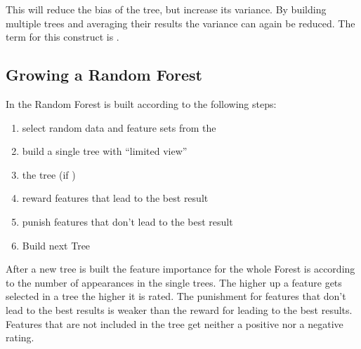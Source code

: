 \documentclass[letterpaper,10pt,english]{sphinxmanual}
\begin{document}
This will reduce the bias of the tree, but increase its variance.
By building multiple trees and averaging their results the variance can again be reduced.
The term for this construct is {\hyperref[\detokenize{Overview:term-random-forest}]{}}.


\subsection{Growing a Random Forest}
\label{\detokenize{RF:growing-a-random-forest}}
In {\hyperref[\detokenize{RF:buildforest}]{}} the Random Forest is built according to the following steps:
\begin{enumerate}
\item {} 
select random data and feature sets from the {\hyperref[\detokenize{Generate_Database:compute}]{}}

\item {} 
build a single tree with ``limited view''

\item {} 
{\hyperref[\detokenize{Overview:term-pruning}]{}} the tree (if {\hyperref[\detokenize{execution:hyperparameters}]{}})

\item {} 
reward features that lead to the best result

\item {} 
punish features that don't lead to the best result

\item {} 
Build next Tree

\end{enumerate}

After a new tree is built the feature importance for the whole Forest is {\hyperref[\detokenize{RF:update-rf}]{}} according to the number of appearances in the single trees.
The higher up a feature gets selected in a tree the higher it is rated. The punishment for features that don't lead to the best results is weaker than the reward for leading to the best results.
Features that are not included in the tree get neither a positive nor a negative rating.
\end{document}
